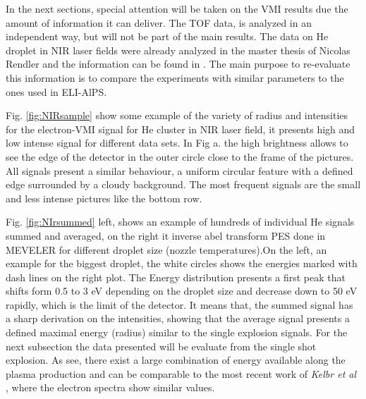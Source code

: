 In the next sections, special attention will be taken on the VMI results due the amount of information it can deliver. The TOF data, is analyzed in an independent way, but will not be part of the main results. The data on He droplet in NIR laser fields were already analyzed in the master thesis of Nicolas Rendler and the information can be found in \cite{rendler_einzelschuss_2017}. The main purpose to re-evaluate this information is to compare the experiments with similar parameters to the ones used in ELI-AlPS.

Fig. \ref{fig:NIRsample} show some example of the variety of radius and intensities for the  electron-VMI signal for He cluster in NIR laser field, it presents high and low intense signal for different data sets. In Fig a. the high brightness allows to see the edge of the detector in the outer circle close to the frame of the pictures. All signals present a similar behaviour, a uniform circular feature with a defined edge surrounded by a cloudy background. The most frequent signals are the small and less intense pictures like the bottom row. 

Fig. \ref{fig:NIrsummed} left, shows an example of hundreds of individual He signals summed and averaged, on the right it inverse abel transform PES done in MEVELER \cite{dick_inverting_2013} for different droplet size (nozzle temperatures).On the left, an example for the biggest droplet, the white circles shows the energies marked with dash lines on the right plot.  The Energy distribution presents a first peak that shifts form 0.5 to 3 eV  depending on the droplet size and decrease down to 50 eV rapidly, which is the limit of the detector. It means that, the summed signal has a sharp derivation on the intensities, showing that the average signal presents a defined maximal energy (radius) similar to the single explosion signals. For the next subsection the data presented will be evaluate from the single shot explosion. As see, there  exist a large combination of energy available along the plasma production and  can be comparable to the most recent work of \textit{Kelbr et al} \cite{kelbg_auger_2019}, where the electron spectra show  similar values.


